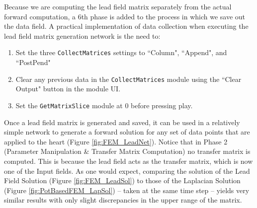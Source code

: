 Because we are computing the lead field matrix separately from the actual forward computation, a 6th phase is added to the process in which we save out the data field.
A practical implementation of data collection when executing the lead field matrix generation network is the need to:
\begin{enumerate}
\itemsep-.25em
\item Set the three {\tt CollectMatrices} settings to ``Column", ``Append", and ``PostPend"
\item Clear any previous data in the {\tt CollectMatrices} module using the ``Clear Output" button in the module UI.
\item Set the {\tt GetMatrixSlice} module at 0 before pressing play.
\end{enumerate}

Once a lead field matrix is generated and saved, it can be used in a relatively simple network to generate a forward solution for any set of data points that are applied to the heart (Figure \ref{fig:FEM_LeadNet}). 
Notice that in Phase 2 (Parameter Manipulation \& Transfer Matrix Computation) no transfer matrix is computed. 
This is because the lead field acts as the transfer matrix, which is now one of the Input fields. 
As one would expect, comparing the solution of the Lead Field Solution (Figure \ref{fig:FEM_LeadSol}) to those of the Laplacian Solution (Figure \ref{fig:PotBasedFEM_LapSol}) -- taken at the same time step -- yields very similar results with only slight discrepancies in the upper range of the matrix.  



\newpage 

